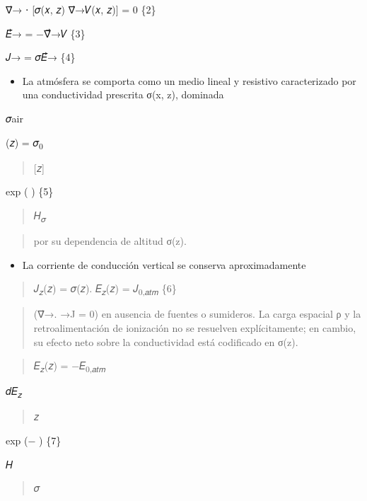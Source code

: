 \documentclass[
]{article}
\providecommand{\tightlist}{%
  \setlength{\itemsep}{0pt}\setlength{\parskip}{0pt}}
\begin{document}
∇⃗→ ⋅ {[}𝜎(𝑥, 𝑧) ∇⃗→𝑉(𝑥, 𝑧){]} = 0 \{2\}

𝐸⃗→ = −∇⃗→𝑉 \{3\}

𝐽→ = 𝜎𝐸⃗→ \{4\}

\begin{itemize}
\tightlist
\item
  La atmósfera se comporta como un medio lineal y resistivo
  caracterizado por una conductividad prescrita σ(x, z), dominada
\end{itemize}

𝜎air

(𝑧) = 𝜎\textsubscript{0}

\begin{quote}
{[}𝑧{]}
\end{quote}

exp ( ) \{5\}

\begin{quote}
𝐻\textsubscript{𝜎}
\end{quote}

\begin{quote}
por su dependencia de altitud σ(z).
\end{quote}

\begin{itemize}
\tightlist
\item
  La corriente de conducción vertical se conserva aproximadamente
\end{itemize}

\begin{quote}
𝐽\textsubscript{𝑧}(𝑧) = 𝜎(𝑧). 𝐸\textsubscript{𝑧}(𝑧) =
𝐽\textsubscript{0,𝑎𝑡𝑚} \{6\}
\end{quote}

\begin{quote}
(∇⃗→. →J = 0) en ausencia de fuentes o sumideros. La carga espacial ρ y
la retroalimentación de ionización no se resuelven explícitamente; en
cambio, su efecto neto sobre la conductividad está codificado en σ(z).
\end{quote}

\begin{quote}
𝐸\textsubscript{𝑧}(𝑧) = −𝐸\textsubscript{0,𝑎𝑡𝑚}
\end{quote}

𝑑𝐸\textsubscript{𝑧}

\begin{quote}
𝑧
\end{quote}

exp (− ) \{7\}

𝐻

\begin{quote}
𝜎
\end{quote}
\end{document}
